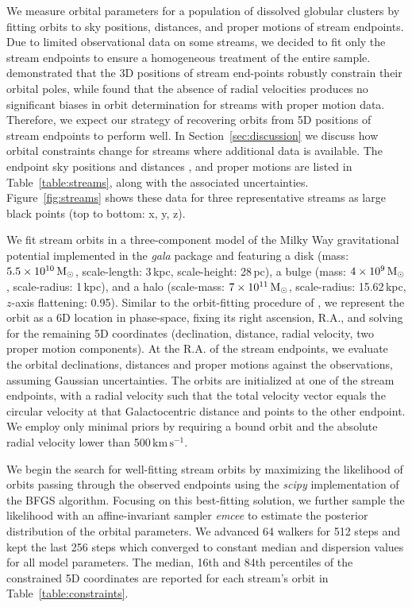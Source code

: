 \documentclass[twocolumn]{aastex63}
\newcommand{\package}[1]{\textsl{#1}}
\newcommand{\kms}{\ensuremath{\textrm{km}\,\textrm{s}^{-1}}}
\begin{document}
We measure orbital parameters for a population of dissolved globular clusters by fitting orbits to sky positions, distances, and proper motions of stream endpoints.
Due to limited observational data on some streams, we decided to fit only the stream endpoints to ensure a homogeneous treatment of the entire sample.
\citet{riley:2020} demonstrated that the 3D positions of stream end-points robustly constrain their orbital poles, while \citet{ibata:2019} found that the absence of radial velocities produces no significant biases in orbit determination for streams with proper motion data.
Therefore, we expect our strategy of recovering orbits from 5D positions of stream endpoints to perform well.
In Section~\ref{sec:discussion} we discuss how orbital constraints change for streams where additional data is available.
The endpoint sky positions and distances \citep{riley:2020}, and proper motions \citep[][as noted]{ibata:2019, shipp:2019} are listed in Table~\ref{table:streams}, along with the associated uncertainties.
Figure~\ref{fig:streams} shows these data for three representative streams as large black points (top to bottom: x, y, z).

We fit stream orbits in a three-component model of the Milky Way gravitational potential implemented in the \package{gala} package \citep{gala} and featuring a \citet{mn:1975} disk (mass: $5.5\times10^{10}\rm\, M_\odot$, scale-length: 3\,kpc, scale-height: 28\,pc), a \citet{hernquist:1990} bulge (mass: $4\times10^9\rm\, M_\odot$, scale-radius: 1\,kpc), and a \citet{nfw:1997} halo (scale-mass: $7\times10^{11}\rm\, M_\odot$, scale-radius: 15.62\,kpc, $z$-axis flattening: 0.95).
Similar to the orbit-fitting procedure of \citet{pwb}, we represent the orbit as a 6D location in phase-space, fixing its right ascension, R.A., and solving for the remaining 5D coordinates (declination, distance, radial velocity, two proper motion components).
At the R.A. of the stream endpoints, we evaluate the orbital declinations, distances and proper motions against the observations, assuming Gaussian uncertainties.
The orbits are initialized at one of the stream endpoints, with a radial velocity such that the total velocity vector equals the circular velocity at that Galactocentric distance and points to the other endpoint.
We employ only minimal priors by requiring a bound orbit and the absolute radial velocity lower than 500\,\kms.

We begin the search for well-fitting stream orbits by maximizing the likelihood of orbits passing through the observed endpoints using the \package{scipy} implementation of the BFGS algorithm.
Focusing on this best-fitting solution, we further sample the likelihood with an affine-invariant sampler \package{emcee} to estimate the posterior distribution of the orbital parameters.
We advanced 64 walkers for 512 steps and kept the last 256 steps which converged to constant median and dispersion values for all model parameters.
The median, 16th and 84th percentiles of the constrained 5D coordinates are reported for each stream's orbit in Table~\ref{table:constraints}.
\end{document}
